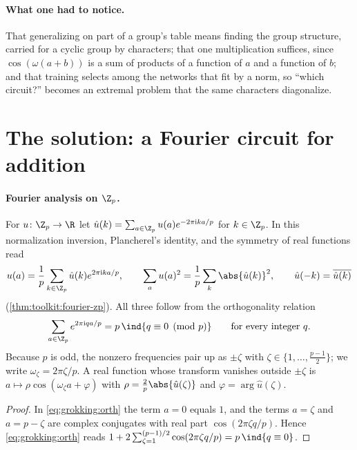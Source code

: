 \begin{refsection}
\paragraph{What one had to notice.} That generalizing on part of a group's table means finding the group structure, carried for a cyclic group by characters; that one multiplication suffices, since $\cos(\omega(a+b))$ is a sum of products of a function of $a$ and a function of $b$; and that training selects among the networks that fit by a norm, so ``which circuit?'' becomes an extremal problem that the same characters diagonalize.

\section{The solution: a Fourier circuit for addition}\label{sec:grokking:circuit}

\paragraph{Fourier analysis on $\grokZp$.} For $u\colon\grokZp\to\R$ let $\hat u(k)=\sum_{a\in\grokZp}u(a)e^{-2\pi\grokii ka/p}$ for $k\in\grokZp$. In this normalization inversion, Plancherel's identity, and the symmetry of real functions read
\[
  u(a)=\frac1p\sum_{k\in\grokZp}\hat u(k)e^{2\pi\grokii ka/p},\qquad \sum_au(a)^2=\frac1p\sum_k\abs{\hat u(k)}^2,\qquad \hat u(-k)=\overline{\hat u(k)}
\]
(\cref{thm:toolkit:fourier-zp}). All three follow from the orthogonality relation
\begin{equation}\label{eq:grokking:orth}
  \sum_{a\in\grokZp}e^{2\pi\grokii qa/p}=p\,\ind\{q\equiv0\pmod p\}\qquad\text{for every integer }q .
\end{equation}
Because $p$ is odd, the nonzero frequencies pair up as $\pm\zeta$ with $\zeta\in\{1,\dots,\frac{p-1}2\}$; we write $\omega_\zeta=2\pi\zeta/p$. A real function whose transform vanishes outside $\pm\zeta$ is $a\mapsto\rho\cos(\omega_\zeta a+\varphi)$ with $\rho=\frac2p\abs{\hat u(\zeta)}$ and $\varphi=\arg\hat u(\zeta)$.


\begin{proof}
In \eqref{eq:grokking:orth} the term $a=0$ equals $1$, and the terms $a=\zeta$ and $a=p-\zeta$ are complex conjugates with real part $\cos(2\pi\zeta q/p)$. Hence \eqref{eq:grokking:orth} reads $1+2\sum_{\zeta=1}^{(p-1)/2}\cos(2\pi\zeta q/p)=p\,\ind\{q\equiv0\}$.
\end{proof}


\end{refsection}
